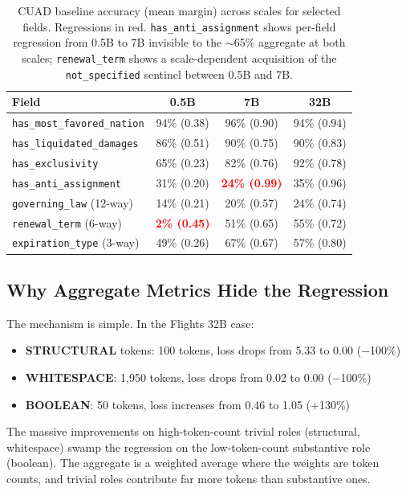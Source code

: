 \documentclass[11pt]{article}
\newcommand{\regress}[1]{\textcolor{red}{\textbf{#1}}}
\begin{document}
\begin{table}[h]
\centering
\small
\begin{tabular}{lccc}
\toprule
\textbf{Field} & \textbf{0.5B} & \textbf{7B} & \textbf{32B} \\
\midrule
\texttt{has\_most\_favored\_nation}  & 94\% (0.38) & 96\% (0.90) & 94\% (0.94) \\
\texttt{has\_liquidated\_damages}    & 86\% (0.51) & 90\% (0.75) & 90\% (0.83) \\
\texttt{has\_exclusivity}            & 65\% (0.23) & 82\% (0.76) & 92\% (0.78) \\
\texttt{has\_anti\_assignment}       & 31\% (0.20) & \regress{24\% (0.99)} & 35\% (0.96) \\
\texttt{governing\_law} (12-way)     & 14\% (0.21) & 20\% (0.57) & 24\% (0.74) \\
\texttt{renewal\_term} (6-way)       & \regress{2\% (0.45)} & 51\% (0.65) & 55\% (0.72) \\
\texttt{expiration\_type} (3-way)    & 49\% (0.26) & 67\% (0.67) & 57\% (0.80) \\
\bottomrule
\end{tabular}
\caption{CUAD baseline accuracy (mean margin) across scales for selected fields. Regressions in red. \texttt{has\_anti\_assignment} shows per-field regression from 0.5B to 7B invisible to the $\sim$65\% aggregate at both scales; \texttt{renewal\_term} shows a scale-dependent acquisition of the \texttt{not\_specified} sentinel between 0.5B and 7B.}
\label{tab:cuad_per_field_scale}
\end{table}

\subsection{Why Aggregate Metrics Hide the Regression}

The mechanism is simple. In the Flights 32B case:
\begin{itemize}
\item \textbf{STRUCTURAL} tokens: 100 tokens, loss drops from 5.33 to 0.00 ($-$100\%)
\item \textbf{WHITESPACE}: 1,950 tokens, loss drops from 0.02 to 0.00 ($-$100\%)
\item \textbf{BOOLEAN}: 50 tokens, loss increases from 0.46 to 1.05 (+130\%)
\end{itemize}

The massive improvements on high-token-count trivial roles (structural, whitespace) swamp the regression on the low-token-count substantive role (boolean). The aggregate is a weighted average where the weights are token counts, and trivial roles contribute far more tokens than substantive ones.
\end{document}
